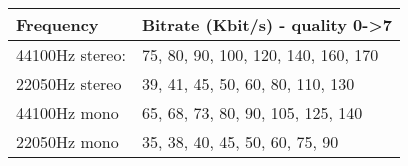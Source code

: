 \begin{table}[h!]
  \begin{center}
    \begin{tabular}{@{}ll@{}}\toprule
      \textbf{Frequency} & \textbf{Bitrate}  (Kbit/s) {}- quality 0{}-{\textgreater}7 \\\midrule
      44100Hz stereo: & 75, 80, 90, 100, 120, 140, 160, 170 \\
      22050Hz stereo & 39, 41, 45, 50, 60, 80, 110, 130 \\
      44100Hz mono & 65, 68, 73, 80, 90, 105, 125, 140 \\
      22050Hz mono & 35, 38, 40, 45, 50, 60, 75, 90 \\\bottomrule
    \end{tabular}
  \end{center}
\end{table}

